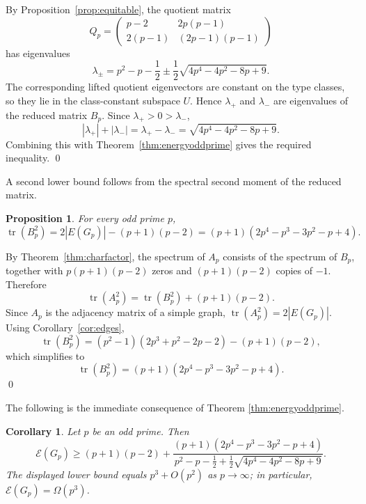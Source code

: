 \documentclass[12pt]{article}
\renewenvironment{proof}{{\bf \noindent Proof.}}{\qed}
\newtheorem{proposition}[theorem]{Proposition}
\newtheorem{corollary}[theorem]{Corollary}
\theoremstyle{definition}
\newcommand{\tr}{\operatorname{tr}}
\begin{document}
	\begin{proof}
		By Proposition~\ref{prop:equitable}, the quotient matrix
		$$
		Q_p=
		\begin{pmatrix}
			p-2 & 2p(p-1)\\[1mm]
			2(p-1) & (2p-1)(p-1)
		\end{pmatrix}
		$$
		has eigenvalues
		$$
		\lambda_{\pm}
		=
		p^2-p-\frac12
		\pm
		\frac12\sqrt{4p^4-4p^2-8p+9}.
		$$
		The corresponding lifted quotient eigenvectors are constant on the type classes, so they lie in the class-constant subspace $U$. Hence $\lambda_+$ and $\lambda_-$ are eigenvalues of the reduced matrix $B_p$. Since $\lambda_+>0>\lambda_-$,
		$$
		|\lambda_+|+|\lambda_-|
		=
		\lambda_+-\lambda_-
		=
		\sqrt{4p^4-4p^2-8p+9}.
		$$
		Combining this with Theorem~\ref{thm:energyoddprime} gives the required inequality.
	\end{proof}
	
	\medskip
	A second lower bound follows from the spectral second moment of the reduced
	matrix.
	
	\begin{proposition}\label{prop:energymoment}
		For every odd prime $p$,
		$$
		\tr(B_p^2)=2|E(G_p)|-(p+1)(p-2)
		=(p+1)(2p^4-p^3-3p^2-p+4).
		$$
	\end{proposition}
	
	\begin{proof}
		By Theorem~\ref{thm:charfactor}, the spectrum of $A_p$ consists of the spectrum of $B_p$, together with $p(p+1)(p-2)$ zeros and $(p+1)(p-2)$ copies of $-1$. Therefore
		$$
		\tr(A_p^2)=\tr(B_p^2)+(p+1)(p-2).
		$$
		Since $A_p$ is the adjacency matrix of a simple graph, $\tr(A_p^2)=2|E(G_p)|$. Using Corollary~\ref{cor:edges},
		$$
		\tr(B_p^2)
		=(p^2-1)(2p^3+p^2-2p-2)-(p+1)(p-2),
		$$
		which simplifies to
		$$
		\tr(B_p^2)=(p+1)(2p^4-p^3-3p^2-p+4).
		$$
	\end{proof}
	
	\medskip
	The following is the immediate consequence of Theorem \ref{thm:energyoddprime}.
	
	\begin{corollary}\label{cor:energymoment}
		Let $p$ be an odd prime. Then
		$$
		\mathcal E(G_p)\ge
		(p+1)(p-2)
		+
		\frac{(p+1)(2p^4-p^3-3p^2-p+4)}
		{p^2-p-\frac12+\frac12\sqrt{4p^4-4p^2-8p+9}}.
		$$
		The displayed lower bound equals $p^3+O(p^2)$ as $p\to\infty$; in particular, $\mathcal E(G_p)=\Omega(p^3)$.
	\end{corollary}
	
\end{document}
